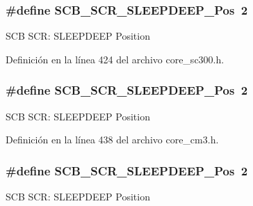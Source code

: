 \subsubsection[{\texorpdfstring{S\+C\+B\+\_\+\+S\+C\+R\+\_\+\+S\+L\+E\+E\+P\+D\+E\+E\+P\+\_\+\+Pos}{SCB_SCR_SLEEPDEEP_Pos}}]{\setlength{\rightskip}{0pt plus 5cm}\#define S\+C\+B\+\_\+\+S\+C\+R\+\_\+\+S\+L\+E\+E\+P\+D\+E\+E\+P\+\_\+\+Pos~2}\hypertarget{group___c_m_s_i_s___s_c_b_gab304f6258ec03bd9a6e7a360515c3cfe}{}\label{group___c_m_s_i_s___s_c_b_gab304f6258ec03bd9a6e7a360515c3cfe}
S\+CB S\+CR\+: S\+L\+E\+E\+P\+D\+E\+EP Position 

Definición en la línea 424 del archivo core\+\_\+sc300.\+h.

\subsubsection[{\texorpdfstring{S\+C\+B\+\_\+\+S\+C\+R\+\_\+\+S\+L\+E\+E\+P\+D\+E\+E\+P\+\_\+\+Pos}{SCB_SCR_SLEEPDEEP_Pos}}]{\setlength{\rightskip}{0pt plus 5cm}\#define S\+C\+B\+\_\+\+S\+C\+R\+\_\+\+S\+L\+E\+E\+P\+D\+E\+E\+P\+\_\+\+Pos~2}\hypertarget{group___c_m_s_i_s___s_c_b_gab304f6258ec03bd9a6e7a360515c3cfe}{}\label{group___c_m_s_i_s___s_c_b_gab304f6258ec03bd9a6e7a360515c3cfe}
S\+CB S\+CR\+: S\+L\+E\+E\+P\+D\+E\+EP Position 

Definición en la línea 438 del archivo core\+\_\+cm3.\+h.

\subsubsection[{\texorpdfstring{S\+C\+B\+\_\+\+S\+C\+R\+\_\+\+S\+L\+E\+E\+P\+D\+E\+E\+P\+\_\+\+Pos}{SCB_SCR_SLEEPDEEP_Pos}}]{\setlength{\rightskip}{0pt plus 5cm}\#define S\+C\+B\+\_\+\+S\+C\+R\+\_\+\+S\+L\+E\+E\+P\+D\+E\+E\+P\+\_\+\+Pos~2}\hypertarget{group___c_m_s_i_s___s_c_b_gab304f6258ec03bd9a6e7a360515c3cfe}{}\label{group___c_m_s_i_s___s_c_b_gab304f6258ec03bd9a6e7a360515c3cfe}
S\+CB S\+CR\+: S\+L\+E\+E\+P\+D\+E\+EP Position 

